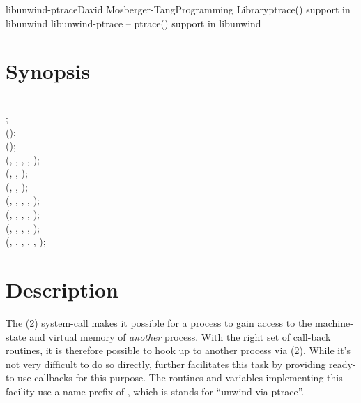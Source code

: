 \documentclass{article}
\begin{document}
\begin{Name}{3}{libunwind-ptrace}{David Mosberger-Tang}{Programming Library}{ptrace() support in libunwind}
  libunwind-ptrace -- ptrace() support in libunwind
\end{Name}

\section{Synopsis}

\\

\noindent
{} ;\\

();\\
\noindent
{} ();\\

\noindent
{} (, , , , );\\
\noindent
{} (, , );\\
\noindent
{} (, , );\\
\noindent
{} (, , , , );\\
\noindent
{} (, , , , );\\
\noindent
{} (, , , , );\\
\noindent
{} (, , , , , );\\

\section{Description}

The (2) system-call makes it possible for a process to
gain access to the machine-state and virtual memory of \emph{another}
process.  With the right set of call-back routines, it is therefore
possible to hook up  to another process via
(2).  While it's not very difficult to do so directly,
 further facilitates this task by providing
ready-to-use callbacks for this purpose.  The routines and variables
implementing this facility use a name-prefix of , which is
stands for ``unwind-via-ptrace''.
\end{document}

